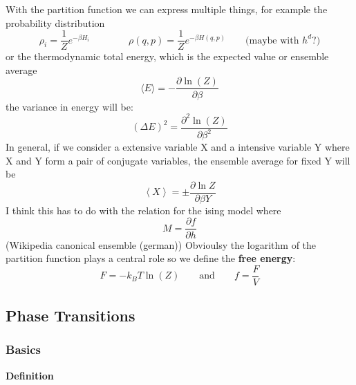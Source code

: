 	With the partition function we can express multiple things, for example the probability distribution
	\begin{equation}
		\rho_i =	\frac{1}{Z} e^{-\beta H_i} \qquad \qquad \rho(q, p) = \frac{1}{Z} e^{-\beta H(q, p)} \qquad \text{(maybe with $h^d$?)}
	\end{equation}
	or the thermodynamic total energy, which is the expected value or ensemble average
	\begin{equation}
		\langle E \rangle =	- \frac{\partial \ln (Z)}{\partial \beta}
	\end{equation}
	the variance in energy will be:
	\begin{equation}
		(\Delta E)^2 =	\frac{\partial^2 \ln (Z)}{\partial \beta^2}
	\end{equation}
	In general, if we consider a extensive variable X and a intensive variable Y where X and Y form a pair of conjugate variables, the ensemble average for fixed Y will be
	\begin{equation}
		\left\langle X \right\rangle = \pm \frac{\partial \ln Z}{\partial \beta Y}
	\end{equation}
	I think this has to do with the relation for the ising model where
	\begin{equation}
		M =	\frac{\partial f}{\partial h}
	\end{equation}
	(Wikipedia canonical ensemble (german)) Obvioulsy the logarithm of the partition function plays a central role so we define the \textbf{free energy}:
	\begin{equation}
		F =	-k_B T \ln(Z) \qquad \text{and} \qquad f =	\frac{F}{V}
	\end{equation}
	\subsection{Phase Transitions}
	\subsubsection{Basics}
	\textbf{Definition}
	
